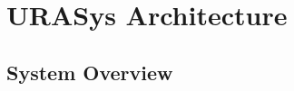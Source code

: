 \documentclass[11pt]{article}
\begin{document}






\section{URASys Architecture}

\subsection{System Overview}
\end{document}
